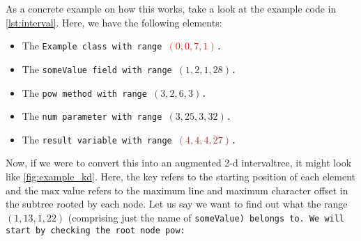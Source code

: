 \documentclass[../thesis]{subfiles}
\begin{document}
As a concrete example on how this works, take a look at the example code in \cref{lst:interval}.
Here, we have the following elements:
\begin{itemize}
	\item The \tt{Example} class with range \textcolor{red}{$(0,0,7,1)$}.
	\item The \tt{someValue} field with range \textcolor{Emerald}{$(1,2,1,28)$}.
	\item The \tt{pow} method with range \textcolor{Peach}{$(3,2,6,3)$}.
	\item The \tt{num} parameter with range \textcolor{OliveGreen}{$(3,25,3,32)$}.
	\item The \tt{result} variable with range \textcolor{Brown}{$(4,4,4,27)$}.
\end{itemize}

Now, if we were to convert this into an augmented 2-d \gls{intervaltree}, it might look like \cref{fig:example_kd}.
Here, the key refers to the starting position of each element and the max value refers to the maximum line and maximum character offset in the subtree rooted by each node.
Let us say we want to find out what the range $(1,13,1,22)$ (comprising just the name of \tt{someValue}) belongs to.
We will start by checking the root node \tt{pow}:
\end{document}
